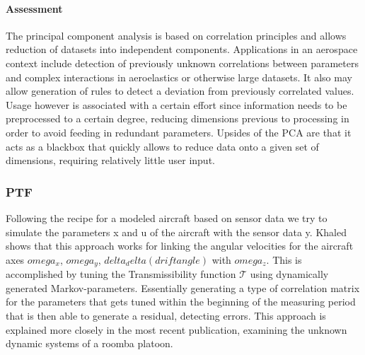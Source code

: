 \paragraph{Assessment}


The principal component analysis is based on correlation principles and allows reduction of datasets into independent components. Applications in an aerospace context include detection of previously unknown correlations between parameters and complex interactions in aeroelastics or otherwise large datasets. It also may allow generation of rules to detect a deviation from previously correlated values. Usage however is associated with a certain effort since information needs to be preprocessed to a certain degree, reducing dimensions previous to processing in order to avoid feeding in redundant parameters. Upsides of the PCA are that it acts as a blackbox that quickly allows to reduce data onto a given set of dimensions, requiring relatively little user input.






\subsubsection{PTF}


Following the recipe for a modeled aircraft based on sensor data we try to simulate the parameters x and u of the aircraft with the sensor data y. Khaled shows that this approach works for linking the angular velocities for the aircraft axes $omega_x$, $omega_y$, $delta_delta(drift angle)$ with $omega_z$. This is accomplished by tuning the Transmissibility function $\mathcal{T}$ using dynamically generated Markov-parameters. Essentially generating a type of correlation matrix for the parameters that gets tuned within the beginning of the measuring period that is then able to generate a residual, detecting errors. This approach is explained more closely in the most recent publication, examining the unknown dynamic systems of a roomba platoon. \cite{khalil_transmissibility-based_2022, khalil_transmissibility-based_2022-1, wolter_anwendung_2014}

